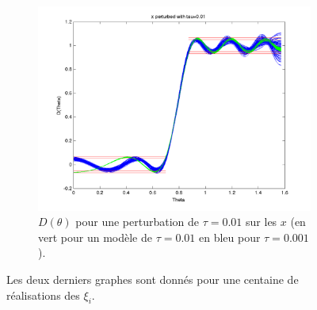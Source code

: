 \begin{figure}[h!]
\begin{subfigure}[b]{0.32\textwidth}
  \end{subfigure}
  ~ 
  \begin{subfigure}[b]{0.32\textwidth}
  \includegraphics[width=1.1\textwidth]{D-ModRobust1-test3Rob01.png}
  \caption{$D(\theta)$ pour une perturbation de $\tau = 0.01$ sur les $x$ (en vert pour un modèle de $\tau=0.01$ en bleu pour $\tau=0.001$).}
  \label{fig:D-ModRobust1-test3RobTau01}
  \end{subfigure}
\caption{Les deux derniers graphes sont donnés pour une centaine de réalisations des $\xi_i$.}
\label{fig:ModROBUST1}
  \end{figure}
  
 

\FloatBarrier